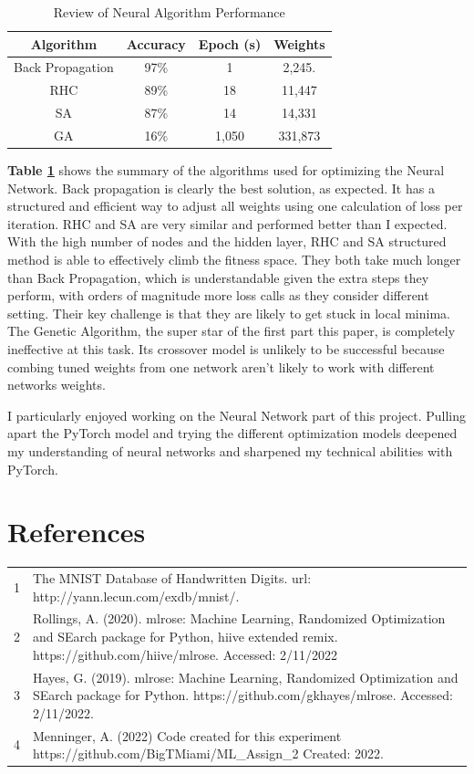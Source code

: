 \documentclass[letterpaper]{article} %
\begin{document}
\begin{center}
\begin{table}[!htb]
\begin{tabular}{||c c c c||} 
 \hline
 Algorithm & Accuracy & Epoch (s) & Weights \\ [0.5ex] 
 \hline\hline
Back Propagation & 97\% & 1 & 2,245. \\ 
 \hline
 RHC & 89\% & 18 & 11,447 \\
 \hline
 SA & 87\% & 14 & 14,331 \\
 \hline
 GA & 16\% & 1,050 & 331,873 \\
 \hline
\end{tabular}
\caption{Review of Neural Algorithm Performance}
\label{table:final_neural}
\end{table}
\end{center}

 \textbf{Table \ref{table:final_neural}} shows the summary of the algorithms used for optimizing the Neural Network.  Back propagation is clearly the best solution, as expected.  It has a structured and efficient way to adjust all weights using one calculation of loss per iteration.  RHC and SA are very similar and performed better than I expected.  With the high number of nodes and the hidden layer, RHC and SA structured method is able to effectively climb the fitness space.  They both take much longer than Back Propagation, which is understandable given the extra steps they perform, with orders of magnitude more loss calls as they consider different setting.  Their key challenge is that they are likely to get stuck in local minima.  The Genetic Algorithm, the super star of the first part this paper, is completely ineffective at this task.  Its crossover model is unlikely to be successful because combing tuned weights from one network aren't likely to work with different networks weights.
 
 I particularly enjoyed working on the Neural Network part of this project.  Pulling apart the PyTorch model and trying the different optimization models deepened my understanding of neural networks and sharpened my technical abilities with PyTorch.

\section{References}
\begin{tabular}{l p{2.75in}}
\\
1 & The MNIST Database of Handwritten Digits. url: http://yann.lecun.com/exdb/mnist/.
\\
2 & Rollings, A. (2020). mlrose: Machine Learning, Randomized Optimization and SEarch package for Python, hiive extended remix. https://github.com/hiive/mlrose. Accessed: 2/11/2022
\\
3 & Hayes, G. (2019). mlrose: Machine Learning, Randomized Optimization and SEarch package for Python. https://github.com/gkhayes/mlrose. Accessed: 2/11/2022.
\\
4 & Menninger, A. (2022)  Code created for this experiment https://github.com/BigTMiami/ML\_Assign\_2  Created: 2022.
\end{tabular}
\end{document}
